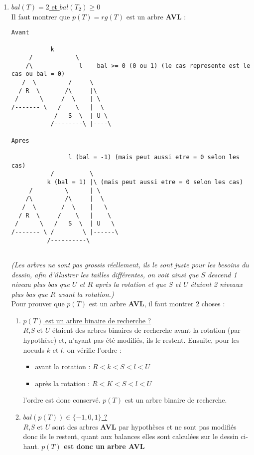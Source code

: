 \documentclass{article}
\begin{document}
\begin{enumerate}
\item \underline{$bal(T) = 2$ et $bal(T_2) \geq 0$} \\
Il faut montrer que $p(T) = rg(T)$ est un arbre \textbf{AVL} :
\begin{lstlisting}
Avant

           k
     /            \
    /\             l    bal >= 0 (0 ou 1) (le cas represente est le cas ou bal = 0)
   /  \         /     \
  / R  \       /\     |\
 /      \     /  \    | \
/------- \   /    \   |  \
            /   S  \  | U \
           /--------\ |----\
           
Apres           

                l (bal = -1) (mais peut aussi etre = 0 selon les cas)
           /          \
          k (bal = 1) |\ (mais peut aussi etre = 0 selon les cas)
     /         \      | \
    /\         /\     |  \                
   /  \       /  \    |   \              
  / R  \     /    \   |    \
 /      \   /   S  \  | U   \
/------- \ /        \ |------\  
          /----------\ 
           
\end{lstlisting}

\textit{(Les arbres ne sont pas grossis réellement, ils le sont juste pour les besoins du dessin, afin 
d'illustrer les tailles différentes, on voit ainsi que $S$ descend 1 niveau plus bas que $U$ et $R$ après la 
rotation et que $S$ et $U$ étaient 2 niveaux plus bas que $R$ avant la rotation.)} \\

\noindent Pour prouver que $p(T)$ est un arbre \textbf{AVL}, il faut montrer 2 choses :
\begin{enumerate}
\item \underline{$p(T)$ est un arbre binaire de recherche ?} \\
$R$,$S$ et $U$ étaient des arbres binaires de recherche avant la rotation (par hypothèse) et, n'ayant pas été 
modifiés, ils le restent. Ensuite, pour les noeuds $k$ et $l$, on vérifie l'ordre : 
\begin{itemize}
\item avant la rotation : $R<k<S<l<U$
\item après la rotation : $R<K<S<l<U$
\end{itemize}
l'ordre est donc conservé. $p(T)$ est un arbre binaire de recherche.
\newpage
\item \underline{$bal(p(T)) \in \{-1,0,1\}$ ?}\\
$R$,$S$ et $U$ sont des arbres \textbf{AVL} par hypothèses et ne sont pas modifiés donc ils le restent, quant aux 
balances elles sont calculées sur le dessin ci-haut. \textbf{$p(T)$ est donc un arbre AVL}
\end{enumerate}


\end{enumerate}
\end{document}
